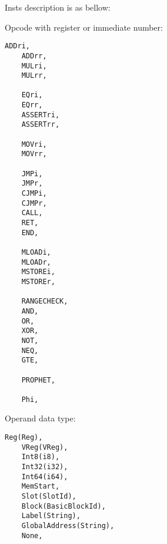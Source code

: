 \begin{itemize}
Insts description is as bellow:

Opcode with register or immediate number:
\begin{lstlisting}[language={}]
    ADDri,
    ADDrr,
    MULri,
    MULrr,

    EQri,
    EQrr,
    ASSERTri,
    ASSERTrr,

    MOVri,
    MOVrr,

    JMPi,
    JMPr,
    CJMPi,
    CJMPr,
    CALL,
    RET,
    END,

    MLOADi,
    MLOADr,
    MSTOREi,
    MSTOREr,

    RANGECHECK,
    AND,
    OR,
    XOR,
    NOT,
    NEQ,
    GTE,

    PROPHET,

    Phi,
\end{lstlisting}

Operand data type:
\begin{lstlisting}[language={}]
    Reg(Reg),
    VReg(VReg),
    Int8(i8),
    Int32(i32),
    Int64(i64),
    MemStart,
    Slot(SlotId),
    Block(BasicBlockId),
    Label(String),
    GlobalAddress(String),
    None,
\end{lstlisting}

\end{itemize}
